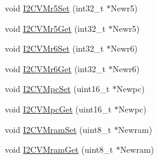 \begin{DoxyCompactItemize}
\item 
void \hyperlink{group___i2_c_v_m_ga2d1f1823a5ae0a66f4c4510408c7d899}{\-I2\-C\-V\-Mr5\-Set} (int32\-\_\-t $\ast$\-Newr5)
\item 
void \hyperlink{group___i2_c_v_m_ga103be98d2a2e1800d2a3d3d5bcec6fee}{\-I2\-C\-V\-Mr5\-Get} (int32\-\_\-t $\ast$\-Newr5)
\item 
void \hyperlink{group___i2_c_v_m_gaff93d03e2a1ec84ff1b2d4eb64f01336}{\-I2\-C\-V\-Mr6\-Set} (int32\-\_\-t $\ast$\-Newr6)
\item 
void \hyperlink{group___i2_c_v_m_gaa478c37e02f07965a11a942f79e60da7}{\-I2\-C\-V\-Mr6\-Get} (int32\-\_\-t $\ast$\-Newr6)
\item 
void \hyperlink{group___i2_c_v_m_gaacc2f76cebb9ac98d31fa60ca748ec64}{\-I2\-C\-V\-Mpc\-Set} (uint16\-\_\-t $\ast$\-Newpc)
\item 
void \hyperlink{group___i2_c_v_m_ga209c17351f55e0f9f0e18b95bdae13e8}{\-I2\-C\-V\-Mpc\-Get} (uint16\-\_\-t $\ast$\-Newpc)
\item 
void \hyperlink{group___i2_c_v_m_gae2f345f59459e5adb9dffe6a40cdcaac}{\-I2\-C\-V\-Mram\-Set} (uint8\-\_\-t $\ast$\-Newram)
\item 
void \hyperlink{group___i2_c_v_m_ga06a76cca76e55d289e1b2f1b5331b2a3}{\-I2\-C\-V\-Mram\-Get} (uint8\-\_\-t $\ast$\-Newram)
\end{DoxyCompactItemize}
